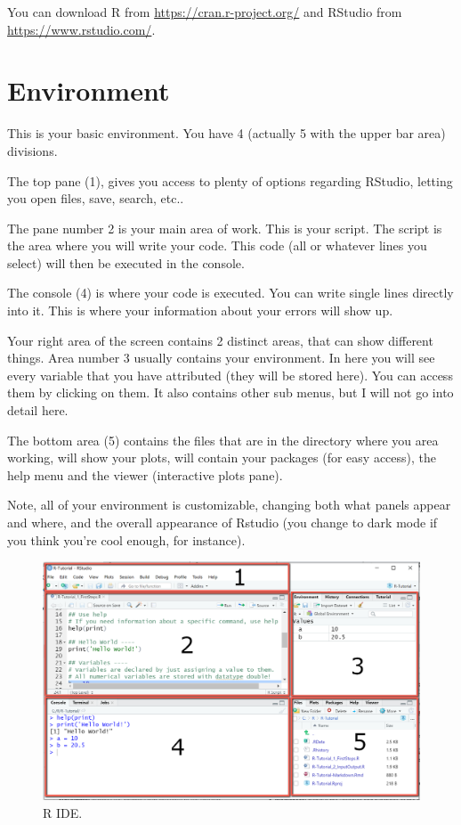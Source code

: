 \documentclass[
]{book}
\begin{document}
You can download R from \url{https://cran.r-project.org/} and RStudio from \url{https://www.rstudio.com/}.

\hypertarget{environment}{%
\section{Environment}\label{environment}}

This is your basic environment.
You have 4 (actually 5 with the upper bar area) divisions.

The top pane (1), gives you access to plenty of options regarding RStudio, letting you open files, save, search, etc..

The pane number 2 is your main area of work.
This is your script.
The script is the area where you will write your code.
This code (all or whatever lines you select) will then be executed in the console.

The console (4) is where your code is executed.
You can write single lines directly into it.
This is where your information about your errors will show up.

Your right area of the screen contains 2 distinct areas, that can show different things.
Area number 3 usually contains your environment.
In here you will see every variable that you have attributed (they will be stored here).
You can access them by clicking on them.
It also contains other sub menus, but I will not go into detail here.

The bottom area (5) contains the files that are in the directory where you area working, will show your plots, will contain your packages (for easy access), the help menu and the viewer (interactive plots pane).

Note, all of your environment is customizable, changing both what panels appear and where, and the overall appearance of Rstudio (you change to dark mode if you think you're cool enough, for instance).

\begin{figure}
\centering
\includegraphics{images/rstudio_ide.png}
\caption{R IDE.}
\end{figure}
\end{document}
